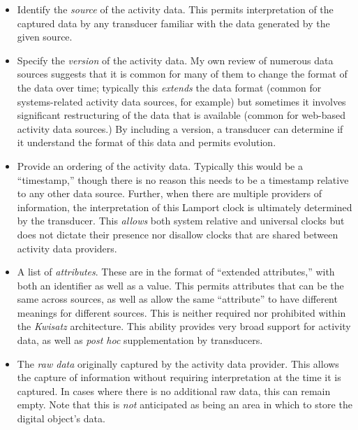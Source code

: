 \documentclass[sigconf,anonymous,review]{acmart}
\newcommand{\system}[0]{\emph{Kwisatz}\xspace}
\begin{document}
\begin{itemize}
    \item Identify the \emph{source} of the activity data.  This permits
    interpretation of the captured data by any transducer familiar with the data
    generated by the given source.

    \item Specify the \emph{version} of the activity data.  My own review of
    numerous data sources suggests that it is common for many of them to change
    the format of the data over time; typically this \emph{extends} the data
    format (common for systems-related activity data sources, for example) but
    sometimes it involves significant restructuring of the data that is
    available (common for web-based activity data sources.)  By including a
    version, a transducer can determine if it understand the format of this data
    and permits evolution.

    \item Provide an ordering of the activity data.  Typically this would be
    a ``timestamp,'' though there is no reason this needs to be a timestamp
    relative to any other data source.  Further, when there are multiple
    providers of information, the interpretation of this Lamport clock is
    ultimately determined by the transducer. This \emph{allows} both system
    relative and universal clocks but does not dictate their presence nor
    disallow clocks that are shared between activity data providers.

    \item A list of \emph{attributes}.  These are in the format of ``extended
    attributes,'' with both an identifier as well as a value.  This permits
    attributes that can be the same across sources, as well as allow the same
    ``attribute'' to have different meanings for different sources.  This is
    neither required nor prohibited within the \system architecture.  This
    ability provides very broad support for activity data, as well as \emph{post
    hoc} supplementation by transducers.

    \item The \emph{raw data} originally captured by the activity data provider.
    This allows the capture of information without requiring interpretation at
    the time it is captured. In cases where there is no additional raw data,
    this can remain empty.  Note that this is \emph{not} anticipated as being an
    area in which to store the digital object's data.

\end{itemize}
\end{document}
